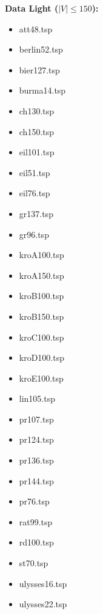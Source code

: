\documentclass[11pt, english, openany]{report}
\begin{document}
\begin{appendices}
		\textbf{Data Light ($ |V| \le 150 $):}
		\begin{multicols}{4}
			\begin{itemize}
				\item att48.tsp
				\item berlin52.tsp
				\item bier127.tsp
				\item burma14.tsp
				\item ch130.tsp
				\item ch150.tsp
				\item eil101.tsp
				\item eil51.tsp
				\item eil76.tsp
				\item gr137.tsp
				\item gr96.tsp
				\item kroA100.tsp
				\item kroA150.tsp
				\item kroB100.tsp
				\item kroB150.tsp
				\item kroC100.tsp
				\item kroD100.tsp
				\item kroE100.tsp
				\item lin105.tsp
				\item pr107.tsp
				\item pr124.tsp
				\item pr136.tsp
				\item pr144.tsp
				\item pr76.tsp
				\item rat99.tsp
				\item rd100.tsp
				\item st70.tsp
				\item ulysses16.tsp
				\item ulysses22.tsp
			\end{itemize}
		\end{multicols}
		

\end{appendices}
\end{document}
